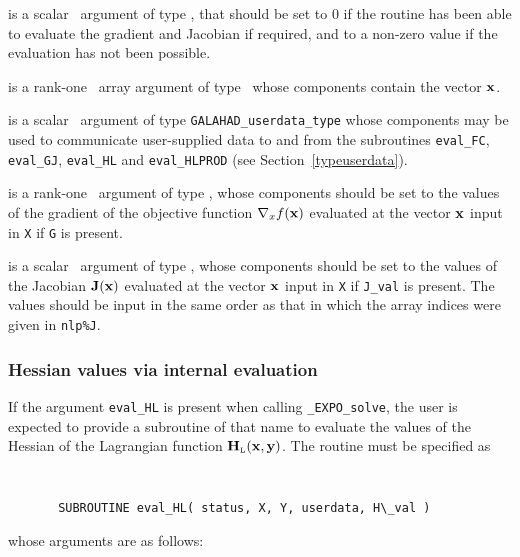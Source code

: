 \documentclass{galahad}
\newcommand{\packagename}{EXPO}
\newcommand{\fullpackagename}{\libraryname\_\packagename}
\newcommand{\solver}{{\tt \fullpackagename\_solve}}
\newcommand{\bmHL}{\bmH\sub{L}}
\begin{document}
\begin{description}
 is a scalar \intentout\ argument of type \integer,
that should be set to 0 if the routine has been able to evaluate
the gradient and Jacobian if required,
and to a non-zero value if the evaluation has not been possible.

 is a rank-one \intentin\ array argument of type \realdp\
whose components contain the vector ${\mathbf{x}}$.

 is a scalar \intentinout\ argument of type
{\tt GALAHAD\_userdata\_type} whose components may be used
to communicate user-supplied data to and from the
subroutines {\tt eval\_FC}, {\tt eval\_GJ},
{\tt eval\_HL} and {\tt eval\_HLPROD}
(see Section~\ref{typeuserdata}).

 is a rank-one \intentout\ argument of type \realdp,
whose components should be set to the values of the gradient
of the objective function $\nabla_x f({\mathbf{x}})$
evaluated at the vector ${\mathbf{x}}$ input in {\tt X} if {\tt G} is present.

 is a scalar \intentout\ argument of type \realdp,
whose components should be set to the values of the Jacobian ${\mathbf{J}}({\mathbf{x}})$
evaluated at the vector ${\mathbf{x}}$ input in {\tt X} if {\tt J\_val} is present.
The values should be input in the same order as that in which the array 
indices were given in {\tt nlp\%J}.

\end{description}


\subsubsection{Hessian values via internal evaluation\label{hfv}}

If the argument {\tt eval\_HL} is present when calling \solver, the
user is expected to provide a subroutine of that name to evaluate the
values of the Hessian of the Lagrangian function $\bmHL(\bmx,\bmy)$.
The routine must be specified as

\def\baselinestretch{0.8}
{\tt
\begin{verbatim}
       SUBROUTINE eval_HL( status, X, Y, userdata, H\_val )
\end{verbatim} }
\def\baselinestretch{1.0}
\noindent whose arguments are as follows:
\end{document}
